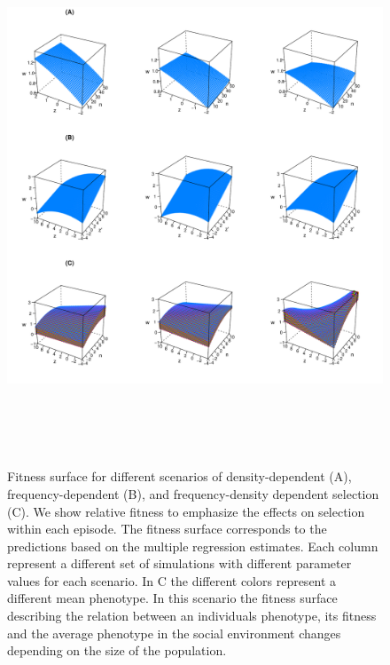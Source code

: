 \documentclass{article}
\begin{document}
\begin{figure}[h] 
	\centering
	\includegraphics[width=16cm, height=16cm]{Figures/Fig5.pdf}
	\caption{Fitness surface for different scenarios of density-dependent (A), frequency-dependent (B), and frequency-density dependent selection (C). We show relative fitness to emphasize the effects on selection within each episode. The fitness surface corresponds to the predictions based on the multiple regression estimates. Each column represent a different set of simulations with different parameter values for each scenario. In C the different colors represent a different mean phenotype. In this scenario the fitness surface describing the relation between an individuals phenotype, its fitness and the average phenotype in the social environment changes depending on the size of the population.} 
	\label{fig:surface}
\end{figure}
\end{document}
